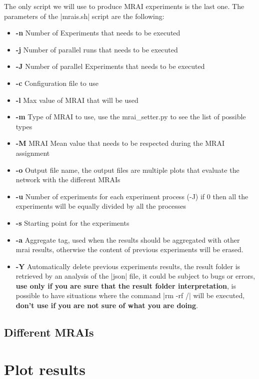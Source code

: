 \documentclass[10pt,journal,onecolumn]{IEEEtran}
\begin{document}
The only script we will use to produce \ac{MRAI} experiments is the last
one.
The parameters of the |mrais.sh| script are the following:
\begin{itemize}
	\item \textbf{-n} Number of Experiments that needs to be executed
	\item \textbf{-j} Number of parallel runs that needs to be executed
	\item \textbf{-J} Number of parallel Experiments that needs to be executed
	\item \textbf{-c} Configuration file to use
	\item \textbf{-l} Max value of \ac{MRAI} that will be used
	\item \textbf{-m} Type of \ac{MRAI} to use, use the mrai\_setter.py to see
		the list of possible types
	\item \textbf{-M} \ac{MRAI} Mean value that needs to be respected during the
		\ac{MRAI} assignment
	\item \textbf{-o} Output file name, the output files are multiple plots that
		evaluate the network with the different \ac{MRAI}s
	\item \textbf{-u} Number of experiments for each experiment process (-J)
		if \num{0} then all the experiments will be equally divided by all the
		processes
	\item \textbf{-s} Starting point for the experiments
	\item \textbf{-a} Aggregate tag, used when the results should be aggregated
		with other mrai results, otherwise the content of previous experiments
		will be erased.
	\item \textbf{-Y} Automatically delete previous experiments results, the result
		folder is retrieved by an analysis of the |json| file, it could be subject
		to bugs or errors, \textbf{use only if you are sure that the result folder
		interpretation}, is possible to have situations where the command |rm -rf /|
		will be executed, \textbf{don't use if you are not sure of what you are doing}.
\end{itemize}

\subsection{Different MRAIs}
\label{subsec:MRAI_types}

\section{Plot results}
\label{sec:plot_results}
\end{document}
